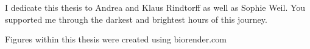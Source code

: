 
I dedicate this thesis to Andrea and Klaus Rindtorff as well as Sophie Weil. You supported me through the darkest and brightest hours of this journey.

Figures within this thesis were created using biorender.com